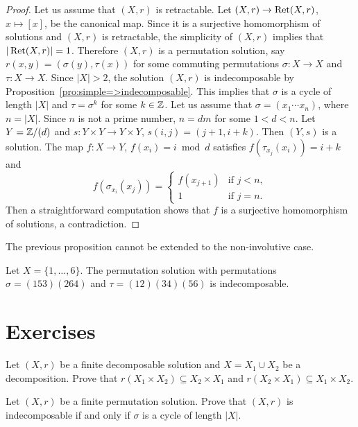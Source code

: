 \begin{proof}
Let us assume that $(X,r)$ is retractable. 
Let $(X,r)\to\operatorname{Ret}(X,r)$, $x\mapsto [x]$, be the canonical map. Since it is a surjective homomorphism of solutions
and $(X,r)$ is retractable, the simplicity of $(X,r)$ implies that $|\operatorname{Ret}(X,r)|=1$. Therefore $(X,r)$ is a permutation solution, say 
$r(x,y)=(\sigma(y),\tau(x))$ for some commuting permutations $\sigma\colon X\to X$
and $\tau\colon X\to X$. Since $|X|>2$, the solution $(X,r)$ 
is indecomposable by Proposition~\ref{pro:simple=>indecomposable}. This implies that $\sigma$ is a cycle of length $|X|$
and $\tau=\sigma^k$ for some $k\in\mathbb{Z}$. Let us assume that 
$\sigma=(x_1\cdots x_n)$, where $n=|X|$. 
Since $n$ is not a prime number, $n=dm$ for some $1<d<n$. Let $Y=\mathbb{Z}/(d)$ and
$s\colon Y\times Y\to Y\times Y$, $s(i,j)=(j+1,i+k)$. Then $(Y,s)$ is a solution. 
The map
$f\colon X\to Y$, $f(x_i)=i\bmod d$
satisfies $f(\tau_{x_j}(x_i))=i+k$ and 
\[
f(\sigma_{x_i}(x_j))
=\begin{cases}
f(x_{j+1}) & \text{if $j<n$},\\
1 & \text{if $j=n$}.
\end{cases}
\]
Then a straightforward computation shows that $f$ is a 
surjective homomorphism of solutions, a contradiction. 
\end{proof}

The previous proposition cannot be extended to the non-involutive case. 

\begin{example}
Let $X=\{1,\dots,6\}$. The permutation solution with 
permutations $\sigma=(153)(264)$ and $\tau=(12)(34)(56)$ is indecomposable.
\end{example}

\section*{Exercises}

\begin{prob}
\label{prob:decomposition}
Let $(X,r)$ be a finite decomposable solution and $X=X_1\cup X_2$ be a decomposition. Prove that
$r(X_1\times X_2)\subseteq X_2\times X_1$ and 
$r(X_2\times X_1)\subseteq X_1\times X_2$. 
\end{prob}

\begin{prob}
Let $(X,r)$ be a finite  permutation solution. 
Prove that $(X,r)$ is indecomposable if and only if $\sigma$ is a cycle of length $|X|$.
\end{prob}


